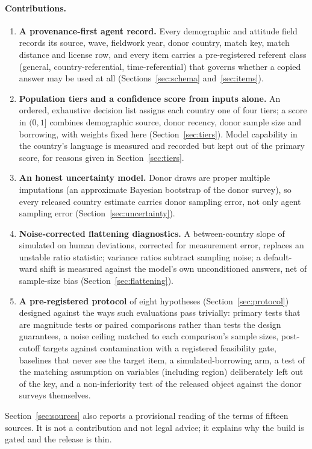 \documentclass[10pt]{article}
\begin{document}
\paragraph{Contributions.}
\begin{enumerate}
  \item \textbf{A provenance-first agent record.} Every demographic and attitude field records its source, wave, fieldwork year, donor country, match key, match distance and license row, and every item carries a pre-registered referent class (general, country-referential, time-referential) that governs whether a copied answer may be used at all (Sections~\ref{sec:schema} and~\ref{sec:items}).
  \item \textbf{Population tiers and a confidence score from inputs alone.} An ordered, exhaustive decision list assigns each country one of four tiers; a score in $(0,1]$ combines demographic source, donor recency, donor sample size and borrowing, with weights fixed here (Section~\ref{sec:tiers}). Model capability in the country's language is measured and recorded but kept out of the primary score, for reasons given in Section~\ref{sec:tiers}.
  \item \textbf{An honest uncertainty model.} Donor draws are proper multiple imputations (an approximate Bayesian bootstrap of the donor survey), so every released country estimate carries donor sampling error, not only agent sampling error (Section~\ref{sec:uncertainty}).
  \item \textbf{Noise-corrected flattening diagnostics.} A between-country slope of simulated on human deviations, corrected for measurement error, replaces an unstable ratio statistic; variance ratios subtract sampling noise; a default-ward shift is measured against the model's own unconditioned answers, net of sample-size bias (Section~\ref{sec:flattening}).
  \item \textbf{A pre-registered protocol} of eight hypotheses (Section~\ref{sec:protocol}) designed against the ways such evaluations pass trivially: primary tests that are magnitude tests or paired comparisons rather than tests the design guarantees, a noise ceiling matched to each comparison's sample sizes, post-cutoff targets against contamination with a registered feasibility gate, baselines that never see the target item, a simulated-borrowing arm, a test of the matching assumption on variables (including region) deliberately left out of the key, and a non-inferiority test of the released object against the donor surveys themselves.
\end{enumerate}
Section~\ref{sec:sources} also reports a provisional reading of the terms of fifteen sources. It is not a contribution and not legal advice; it explains why the build is gated and the release is thin.
\end{document}
